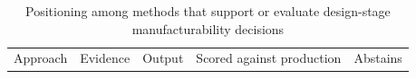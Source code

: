 \documentclass[pdflatex,sn-basic,lineno]{sn-jnl} %
\newcommand{\tabsize}{\fontsize{8}{9.5}\selectfont}
\providecommand{\DIFaddbeginFL}{} %
\providecommand{\DIFdelbeginFL}{} %
\providecommand{\DIFdelendFL}{} %
\newcommand{\DIFscaledelfig}{0.5}
\newlength{\DIFdelgraphicswidth} %
\newlength{\DIFdelgraphicsheight} %
\newcommand{\DIFaddincludegraphics}[2][]{{\color{blue}\fbox{\DIFOincludegraphics[#1]{#2}}}} %
\newcommand{\DIFdelincludegraphics}[2][]{%
\sbox{\DIFdelgraphicsbox}{\DIFOincludegraphics[#1]{#2}}%
\settoboxwidth{\DIFdelgraphicswidth}{\DIFdelgraphicsbox} %
\settoboxtotalheight{\DIFdelgraphicsheight}{\DIFdelgraphicsbox} %
\scalebox{\DIFscaledelfig}{%
\parbox[b]{\DIFdelgraphicswidth}{\usebox{\DIFdelgraphicsbox}\\[-\baselineskip] \rule{\DIFdelgraphicswidth}{0em}}\llap{\resizebox{\DIFdelgraphicswidth}{\DIFdelgraphicsheight}{%
\setlength{\unitlength}{\DIFdelgraphicswidth}%
\begin{picture}(1,1)%
\thicklines\linethickness{2pt} %
{\color[rgb]{1,0,0}\put(0,0){\framebox(1,1){}}}%
{\color[rgb]{1,0,0}\put(0,0){\line( 1,1){1}}}%
{\color[rgb]{1,0,0}\put(0,1){\line(1,-1){1}}}%
\end{picture}%
}\hspace*{3pt}}} %
} %
\DeclareRobustCommand{\DIFaddbeginFL}{\DIFOaddbeginFL \let\includegraphics\DIFaddincludegraphics} %
\DeclareRobustCommand{\DIFdelbeginFL}{\DIFOdelbeginFL \let\includegraphics\DIFdelincludegraphics} %
\DeclareRobustCommand{\DIFdelendFL}{\DIFOaddendFL \let\includegraphics\DIFOincludegraphics} %
\begin{document}
\begin{table}[t]
\tabsize
\setlength{\tabcolsep}{3.5pt}
\caption{Positioning among methods that support or evaluate design-stage manufacturability decisions}\label{tab:positioning}
\DIFdelbeginFL %
\DIFdelendFL \DIFaddbeginFL \begin{tabular}{@{}L{3.0cm}L{2.5cm}L{3.0cm}L{1.9cm}L{1.6cm}@{}}
\toprule
Approach & Evidence & Output & Scored against production & Abstains \\

\end{tabular}
\end{table}
\end{document}
